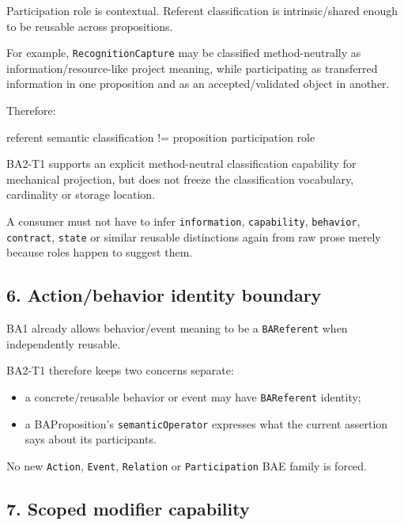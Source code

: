 \documentclass[
  10pt,
  letterpaper,
]{article}
\newenvironment{Shaded}{}{}
\newcommand{\NormalTok}[1]{#1}
\providecommand{\tightlist}{%
  \setlength{\itemsep}{0pt}\setlength{\parskip}{0pt}}
\begin{document}
Participation role is contextual. Referent classification is
intrinsic/shared enough to be reusable across propositions.

For example, \texttt{RecognitionCapture} may be classified
method-neutrally as information/resource-like project meaning, while
participating as transferred information in one proposition and as an
accepted/validated object in another.

Therefore:

\begin{Shaded}
\begin{Highlighting}[]
\NormalTok{referent semantic classification}
\NormalTok{        !=}
\NormalTok{proposition participation role}
\end{Highlighting}
\end{Shaded}

BA2-T1 supports an explicit method-neutral classification capability for
mechanical projection, but does not freeze the classification
vocabulary, cardinality or storage location.

A consumer must not have to infer \texttt{information},
\texttt{capability}, \texttt{behavior}, \texttt{contract},
\texttt{state} or similar reusable distinctions again from raw prose
merely because roles happen to suggest them.

\subsection{6. Action/behavior identity
boundary}\label{actionbehavior-identity-boundary}

BA1 already allows behavior/event meaning to be a \texttt{BAReferent}
when independently reusable.

BA2-T1 therefore keeps two concerns separate:

\begin{itemize}
\tightlist
\item
  a concrete/reusable behavior or event may have \texttt{BAReferent}
  identity;
\item
  a BAProposition's \texttt{semanticOperator} expresses what the current
  assertion says about its participants.
\end{itemize}

No new \texttt{Action}, \texttt{Event}, \texttt{Relation} or
\texttt{Participation} BAE family is forced.

\subsection{7. Scoped modifier
capability}\label{scoped-modifier-capability}
\end{document}
